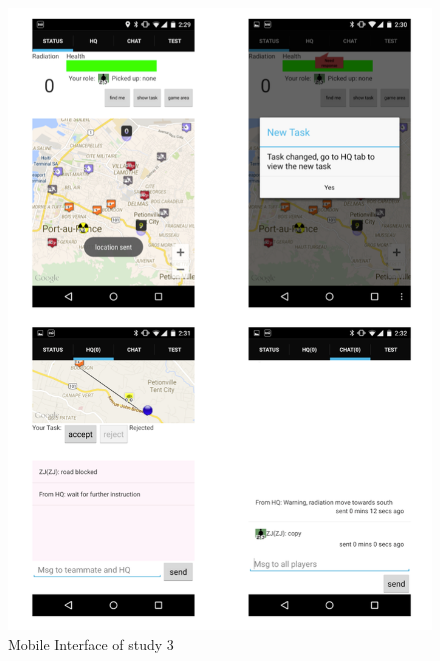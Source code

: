 \begin{figure}[H]
  \centering
  \includegraphics[width=1\textwidth]{img/conclusion/study3interfaceMobile}
  \caption{Mobile Interface of study 3}
  \label{fig:study3interfacemobile}
\end{figure}


